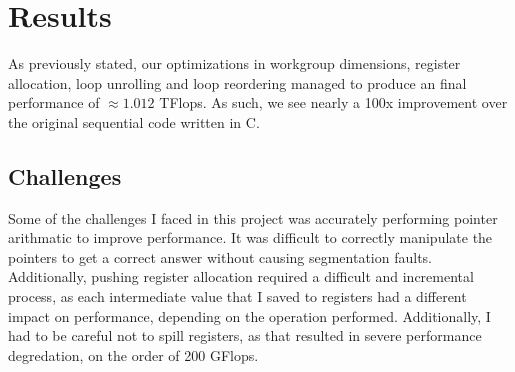 \documentclass[letterpaper,twocolumn,10pt]{article}
\begin{document}
\section{Results}
As previously stated, our optimizations in workgroup dimensions, register
allocation, loop unrolling and loop reordering managed to produce an final
performance of $\approx 1.012$ TFlops. As such, we see nearly a 100x
improvement over the original sequential code written in C.
\subsection{Challenges}
Some of the challenges I faced in this project was accurately performing
pointer arithmatic to improve performance. It was difficult to correctly
manipulate the pointers to get a correct answer without causing segmentation
faults. Additionally, pushing register allocation required a difficult and
incremental process, as each intermediate value that I saved to registers had a
different impact on performance, depending on the operation performed. 
Additionally, I had to be careful not to spill registers, as that resulted in
severe performance degredation, on the order of 200 GFlops.
\end{document}
